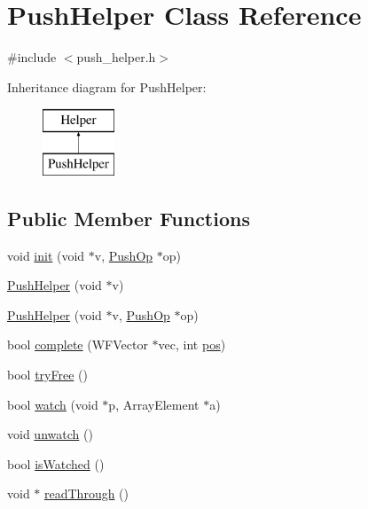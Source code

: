 \hypertarget{class_push_helper}{}\section{Push\+Helper Class Reference}
\label{class_push_helper}


{\ttfamily \#include $<$push\+\_\+helper.\+h$>$}

Inheritance diagram for Push\+Helper\+:\begin{figure}[H]
\begin{center}
\leavevmode
\includegraphics[height=2.000000cm]{class_push_helper}
\end{center}
\end{figure}
\subsection*{Public Member Functions}
\begin{DoxyCompactItemize}
\item 
void \hyperlink{class_push_helper_af0f2b3d32c4fa045423c0c33338fda6d}{init} (void $\ast$v, \hyperlink{class_push_op}{Push\+Op} $\ast$op)
\item 
\hyperlink{class_push_helper_a280f399f92564f84624c8044a7068fcf}{Push\+Helper} (void $\ast$v)
\item 
\hyperlink{class_push_helper_af0ae04521864c1ae2d3fa09e85d97fc6}{Push\+Helper} (void $\ast$v, \hyperlink{class_push_op}{Push\+Op} $\ast$op)
\item 
bool \hyperlink{class_push_helper_ad7439a580cc3979f4a8d024209f02a48}{complete} (W\+F\+Vector $\ast$vec, int \hyperlink{class_push_helper_afc30e140af18bc227c92363abeb504a1}{pos})
\item 
bool \hyperlink{class_push_helper_ad3a73efd37ac6b130da9892ce17a15f9}{try\+Free} ()
\item 
bool \hyperlink{class_push_helper_a3a766549de39a978203ec9e24d0adcce}{watch} (void $\ast$p, Array\+Element $\ast$a)
\item 
void \hyperlink{class_push_helper_ae5261cf5cc0aec9f9ea0e38bef6dec92}{unwatch} ()
\item 
bool \hyperlink{class_push_helper_aae1e891a2cde3c4d718bf02be0369a46}{is\+Watched} ()
\item 
void $\ast$ \hyperlink{class_push_helper_a3711a9e4be2b548b89f0c945907ceed0}{read\+Through} ()
\end{DoxyCompactItemize}

